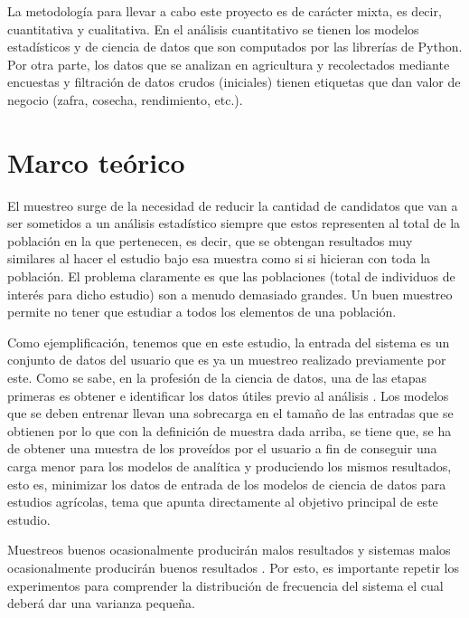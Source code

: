 \documentclass{report}
\begin{document}
La metodología para llevar a cabo este proyecto es de carácter mixta, es decir, cuantitativa y cualitativa. En el análisis cuantitativo se tienen los modelos estadísticos y de ciencia de datos que son computados por las librerías de Python. Por otra parte, los datos que se analizan en agricultura y recolectados mediante encuestas y filtración de datos crudos (iniciales) tienen etiquetas que dan valor de negocio (zafra, cosecha, rendimiento, etc.).

\chapter{Marco teórico}

El muestreo surge de la necesidad de reducir la cantidad de candidatos que van a ser sometidos a un análisis estadístico siempre que estos representen al total de la población en la que pertenecen, es decir, que se obtengan resultados muy similares al hacer el estudio bajo esa muestra como si si hicieran con toda la población. El problema claramente es que las poblaciones (total de individuos de interés para dicho estudio) son a menudo demasiado grandes. Un buen muestreo permite no tener que estudiar a todos los elementos de una población. 

\bigbreak

Como ejemplificación, tenemos que en este estudio, la entrada del sistema es un conjunto de datos del usuario que es ya un muestreo realizado previamente por este. Como se sabe, en la profesión de la ciencia de datos, una de las etapas primeras es obtener e identificar los datos útiles previo al análisis \cite{university-of-wisconsin-data-science-2021}. Los modelos que se deben entrenar llevan una sobrecarga en el tamaño de las entradas que se obtienen por lo que con la definición de muestra dada arriba, se tiene que, se ha de obtener una muestra de los  proveídos por el usuario a fin de conseguir una carga menor para los modelos de analítica y produciendo los mismos resultados, esto es, minimizar los datos de entrada de los modelos de ciencia de datos para estudios agrícolas, tema que apunta directamente al objetivo principal de este estudio.

\bigbreak

Muestreos buenos ocasionalmente producirán malos resultados y sistemas malos ocasionalmente producirán buenos resultados \cite{gulland-1966}. Por esto, es importante repetir los experimentos para comprender la distribución de frecuencia del sistema el cual deberá dar una varianza pequeña.
\end{document}
